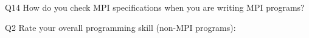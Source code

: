 \begin{description}%
\item{Q14} How do you check MPI specifications when you are writing MPI programs?%
\item{Q2} Rate your overall programming skill (non-MPI programs):%
\end{description}%

